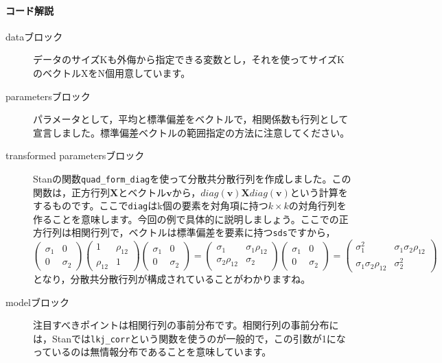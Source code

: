 \documentclass{ltjsbook}
\begin{document}
\paragraph{コード解説}
\begin{description}
    \item[dataブロック] データのサイズKも外侮から指定できる変数とし，それを使ってサイズKのベクトルXをN個用意しています。
    \item[parametersブロック] パラメータとして，平均と標準偏差をベクトルで，相関係数も行列として宣言しました。標準偏差ベクトルの範囲指定の方法に注意してください。
    \item[transformed parametersブロック] Stanの関数\verb|quad_form_diag|を使って分散共分散行列を作成しました。この関数は，正方行列$\bm{X}$とベクトル$\bm{v}$から，$diag(\bm{v}) \bm{X} diag(\bm{v})$という計算をするものです。ここで\verb|diag|はk個の要素を対角項に持つ$k \times k$の対角行列を作ることを意味します。今回の例で具体的に説明しましょう。ここでの正方行列は相関行列で，ベクトルは標準偏差を要素に持つ\verb|sds|ですから，
    \[ \begin{pmatrix}\sigma_1&0\\0&\sigma_2\end{pmatrix}\begin{pmatrix}1&\rho_{12}\\\rho_{12}&1\end{pmatrix}\begin{pmatrix}\sigma_1&0\\0&\sigma_2\end{pmatrix} =
    \begin{pmatrix} \sigma_1 & \sigma_1\rho_{12}\\ \sigma_2\rho_{12} & \sigma_2\end{pmatrix}\begin{pmatrix}\sigma_1 & 0\\ 0 & \sigma_2\end{pmatrix} = 
    \begin{pmatrix}\sigma_1^2 & \sigma_1\sigma_2\rho_{12} \\ \sigma_1\sigma_2\rho_{12} & \sigma_2^2\end{pmatrix} \]
    となり，分散共分散行列が構成されていることがわかりますね。
    \item[modelブロック] 注目すべきポイントは相関行列の事前分布です。相関行列の事前分布には，Stanでは\verb|lkj_corr|という関数を使うのが一般的で，この引数が1になっているのは無情報分布であることを意味しています。
\end{description}
\end{document}
